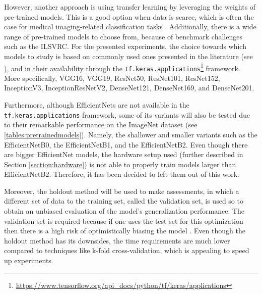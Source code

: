     However, another approach is using transfer learning by leveraging the weights of pre-trained models. This is a good option when data is scarce, which is often the case for medical imaging-related classification tasks \cite{Ching2018}. Additionally, there is a wide range of pre-trained models to choose from, because of benchmark challenges such as the \ac{ILSVRC}. For the presented experiments, the choice towards which models to study is based on commonly used ones presented in the literature (see ), and in their availability through the \verb|tf.keras.applications|\footnote{\url{https://www.tensorflow.org/api_docs/python/tf/keras/applications}} framework. More specifically, VGG16, VGG19, ResNet50, ResNet101, ResNet152, InceptionV3, InceptionResNetV2, DenseNet121, DenseNet169, and DenseNet201. \par
    
    Furthermore, although EfficientNets are not available in the \verb|tf.keras.applications| framework, some of its variants will also be tested due to their remarkable performance on the ImageNet dataset (see \autoref{tables:pretrainedmodels}). Namely, the shallower and smaller variants such as the EfficientNetB0, the EfficientNetB1, and the EfficientNetB2. Even though there are bigger EfficientNet models, the hardware setup used (further described in Section \ref{section:hardware}) is not able to properly train models larger than EfficientNetB2. Therefore, it has been decided to left them out of this work. \par
    
    Moreover, the holdout method will be used to make assessments, in which a different set of data to the training set, called the validation set, is used so to obtain an unbiased evaluation of the model’s generalization performance. The validation set is required because if one uses the test set for this optimization then there is a high risk of optimistically biasing the model \cite{talbot}. Even though the holdout method has its downsides, the time requirements are much lower compared to techniques like k-fold cross-validation, which is appealing to speed up experiments. \par
    
